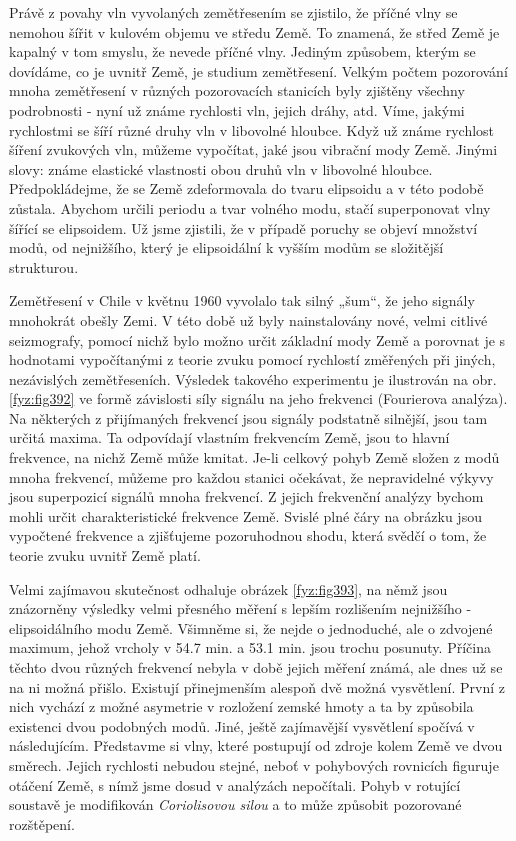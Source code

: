 {  Právě z povahy vln vyvolaných zemětřesením se zjistilo, že příčné vlny se nemohou šířit v kulovém 
  objemu ve středu Země. To znamená, že střed Země je kapalný v tom smyslu, že nevede příčné vlny. 
  Jediným způsobem, kterým se dovídáme, co je uvnitř Země, je studium zemětřesení. Velkým počtem 
  pozorování mnoha zemětřesení v různých pozorovacích stanicích byly zjištěny všechny podrobnosti - 
  nyní už známe rychlosti vln, jejich dráhy, atd. Víme, jakými rychlostmi se šíří různé druhy vln v 
  libovolné hloubce. Když už známe rychlost šíření zvukových vln, můžeme vypočítat, jaké jsou 
  vibrační mody Země. Jinými slovy: známe elastické vlastnosti obou druhů vln v libovolné hloubce. 
  Předpokládejme, že se Země zdeformovala do tvaru elipsoidu a v této podobě zůstala. Abychom 
  určili periodu a tvar volného modu, stačí superponovat vlny šířící se elipsoidem. Už jsme 
  zjistili, že v případě poruchy se objeví množství modů, od nejnižšího, který je elipsoidální k 
  vyšším modům se složitější strukturou.
  
  Zemětřesení v Chile v květnu 1960 vyvolalo tak silný „šum“, že jeho signály mnohokrát obešly 
  Zemi. V této době už byly nainstalovány nové, velmi citlivé seizmografy, pomocí nichž bylo možno 
  určit základní mody Země a porovnat je s hodnotami vypočítanými z teorie zvuku pomocí rychlostí 
  změřených při jiných, nezávislých zemětřeseních. Výsledek takového experimentu je ilustrován na 
  obr. \ref{fyz:fig392} ve formě závislosti síly signálu na jeho frekvenci (Fourierova analýza). Na 
  některých z přijímaných frekvencí jsou signály podstatně silnější, jsou tam určitá maxima. Ta 
  odpovídají vlastním frekvencím Země, jsou to hlavní frekvence, na nichž Země může kmitat. Je-li 
  celkový pohyb Země složen z modů mnoha frekvencí, můžeme pro každou stanici očekávat, že 
  nepravidelné výkyvy jsou superpozicí signálů mnoha frekvencí. Z jejich frekvenční analýzy bychom 
  mohli určit charakteristické frekvence Země. Svislé plné čáry na obrázku jsou vypočtené frekvence 
  a zjišťujeme pozoruhodnou shodu, která svědčí o tom, že teorie zvuku uvnitř Země platí.
  
  Velmi zajímavou skutečnost odhaluje obrázek \ref{fyz:fig393}, na němž jsou znázorněny výsledky 
  velmi přesného měření s lepším rozlišením nejnižšího - elipsoidálního modu Země. Všimněme si, že 
  nejde o jednoduché, ale o zdvojené maximum, jehož vrcholy v \num{54.7} min. a \num{53.1} min. 
  jsou trochu posunuty. Příčina těchto dvou různých frekvencí nebyla v době jejich měření známá, 
  ale dnes už se na ni možná přišlo. Existují přinejmenším alespoň dvě možná vysvětlení. První z 
  nich vychází z možné asymetrie v rozložení zemské hmoty a ta by způsobila existenci dvou 
  podobných modů. Jiné, ještě zajímavější vysvětlení spočívá v následujícím. Představme si vlny, 
  které postupují od zdroje kolem Země ve dvou směrech. Jejich rychlosti nebudou stejné, neboť v 
  pohybových rovnicích figuruje otáčení Země, s nímž jsme dosud v analýzách nepočítali. Pohyb v 
  rotující soustavě je modifikován \emph{Coriolisovou silou} a to může způsobit pozorované 
  rozštěpení.

}
